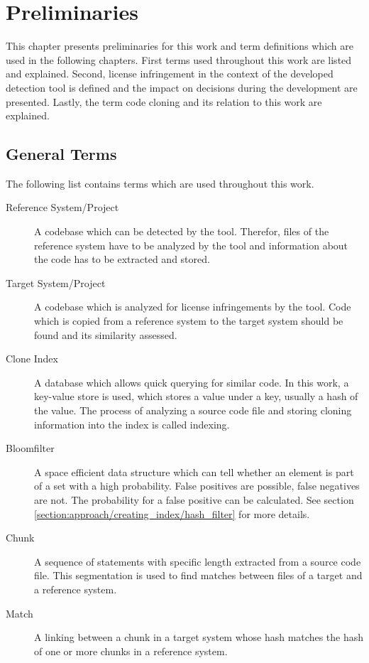 
\chapter{Preliminaries}\label{chapter:preliminaries}
This chapter presents preliminaries for this work and term definitions which are used in the following chapters.
First terms used throughout this work are listed and explained.
Second, license infringement in the context of the developed detection tool is defined and the impact on decisions during the development are presented.
Lastly, the term code cloning and its relation to this work are explained.

\section{General Terms}\label{section:preliminaries/terms}
The following list contains terms which are used throughout this work.

\begin{description}
	\item[Reference System/Project]
		A codebase which can be detected by the tool. 
		Therefor, files of the reference system have to be analyzed by the tool and information about the code has to be extracted and stored.
	\item[Target System/Project]
		A codebase which is analyzed for license infringements by the tool.
		Code which is copied from a reference system to the target system should be found and its similarity assessed.
	\item[Clone Index] 
		A database which allows quick querying for similar code.
		In this work, a key-value store is used, which stores a value under a key, usually a hash of the value.
		The process of analyzing a source code file and storing cloning information into the index is called indexing.
	\item [Bloomfilter]
		A space efficient data structure which can tell whether an element is part of a set with a high probability. 
		False positives are possible, false negatives are not.
		The probability for a false positive can be calculated. 
		See section \ref{section:approach/creating_index/hash_filter} for more details.
	\item [Chunk]
		A sequence of statements with specific length extracted from a source code file.
		This segmentation is used to find matches between files of a target and a reference system.
	\item [Match]
		A linking between a chunk in a target system whose hash matches the hash of one or more chunks in a reference system.
\end{description}

